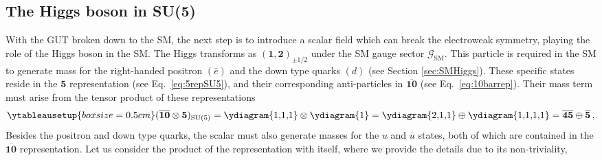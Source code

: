\subsection{The Higgs boson in SU(5)}
With the GUT broken down to the SM, the next step is to introduce a scalar field which can break the electroweak symmetry, playing the role of the Higgs boson in the SM. The Higgs transforms as $(\mathbf{1},\mathbf{2})_{\pm1/2}$ under the SM gauge sector $\mathcal{G}_\mathrm{SM}$. This particle is required in the SM to generate mass for the right-handed positron $(\bar{e})$ and the down type quarks $(d)$ (see Section \ref{sec:SMHiggs}).  These specific states reside in the $\mathbf{5}$ representation (see Eq.~\eqref{eq:5repSU5}), and their corresponding anti-particles in $\overline{\mathbf{10}}$ (see Eq.~\eqref{eq:10barrep}). Their mass term must arise from the tensor product of these representations \cite{Georgi:1999wka}
\begin{align}
    \ytableausetup{boxsize=0.5cm}
     (\overline{\mathbf{10}}\otimes{\mathbf{5}})_{\SU(5)}=\vcenter{\hbox{\ydiagram{1,1,1}}} \otimes \vcenter{\hbox{\ydiagram{1}}}=\vcenter{\hbox{\ydiagram{2,1,1}}}\oplus \vcenter{\hbox{\ydiagram{1,1,1,1}}} =\overline{\mathbf{45}}\oplus \overline{\mathbf{5}}\,, 
\end{align} 
Besides the positron and down type quarks, the scalar must also generate masses for the ${u}$ and $\overline{u}$ states, both of which are contained in the $\overline{\mathbf{10}}$ representation. Let us consider the product of the representation with itself, where we provide the details due to its non-triviality,
